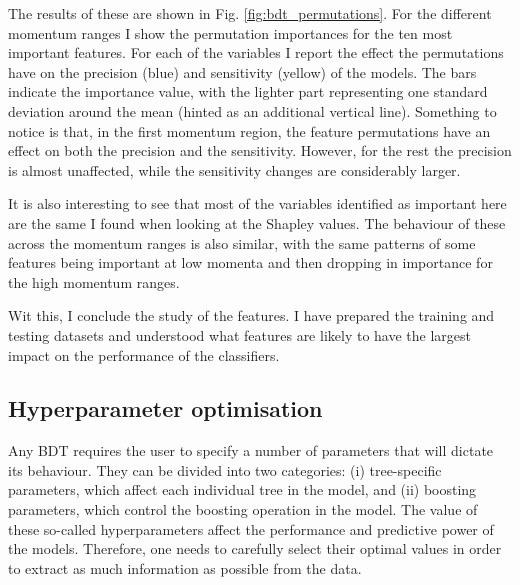 The results of these are shown in Fig. \ref{fig:bdt_permutations}. For the different momentum ranges I show the permutation importances for the ten most important features. For each of the variables I report the effect the permutations have on the precision (blue) and sensitivity (yellow) of the models. The bars indicate the importance value, with the lighter part representing one standard deviation around the mean (hinted as an additional vertical line). Something to notice is that, in the first momentum region, the feature permutations have an effect on both the precision and the sensitivity. However, for the rest the precision is almost unaffected, while the sensitivity changes are considerably larger.

It is also interesting to see that most of the variables identified as important here are the same I found when looking at the Shapley values. The behaviour of these across the momentum ranges is also similar, with the same patterns of some features being important at low momenta and then dropping in importance for the high momentum ranges.

Wit this, I conclude the study of the features. I have prepared the training and testing datasets and understood what features are likely to have the largest impact on the performance of the classifiers.

\subsection{Hyperparameter optimisation}

Any BDT requires the user to specify a number of parameters that will dictate its behaviour. They can be divided into two categories: (i) tree-specific parameters, which affect each individual tree in the model, and (ii) boosting parameters, which control the boosting operation in the model. The value of these so-called hyperparameters affect the performance and predictive power of the models. Therefore, one needs to carefully select their optimal values in order to extract as much information as possible from the data.

